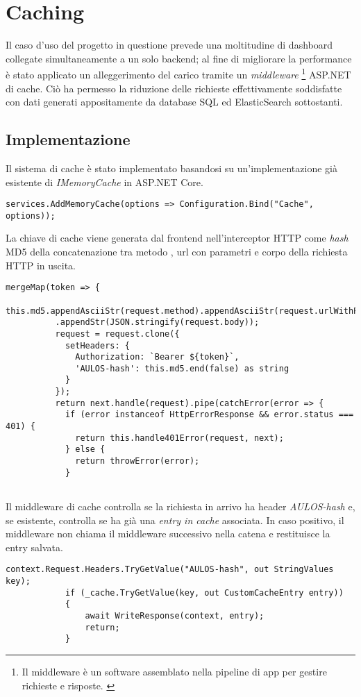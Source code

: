 \section{Caching}
\label{ch:caching}
Il caso d'uso del progetto in questione prevede una moltitudine di dashboard collegate simultaneamente a un solo backend; al fine di  migliorare la performance è stato applicato un alleggerimento del carico tramite un \textit{middleware} \footnote{Il middleware è un software assemblato nella pipeline di app per gestire richieste e risposte. \cite{Middleware}} ASP.NET di cache. Ciò ha permesso la riduzione delle richieste effettivamente soddisfatte con dati generati appositamente da database SQL ed ElasticSearch sottostanti.
\subsection{Implementazione}
Il sistema di cache è stato implementato basandosi su un'implementazione già esistente di \textit{IMemoryCache} in ASP.NET Core. \cite{MemCache}
\begin{lstlisting}[caption={Startup.cs, Memory Cache Injection}, style=javaScriptCode]
services.AddMemoryCache(options => Configuration.Bind("Cache", options));
\end{lstlisting}

La chiave di cache viene generata dal frontend nell'interceptor HTTP come \textit{hash} MD5 \cite{MD5} della concatenazione tra metodo \cite{HTTPMETHODS}, url con parametri \cite{HTTPPARAMS} e corpo \cite{HTTPBODY} della richiesta HTTP in uscita.
\begin{lstlisting}[caption={Http Interceptor, line 28}, style=javaScriptCode]
mergeMap(token => {
          this.md5.appendAsciiStr(request.method).appendAsciiStr(request.urlWithParams)
          .appendStr(JSON.stringify(request.body));
          request = request.clone({
            setHeaders: {
              Authorization: `Bearer ${token}`,
              'AULOS-hash': this.md5.end(false) as string
            }
          });
          return next.handle(request).pipe(catchError(error => {
            if (error instanceof HttpErrorResponse && error.status === 401) {
              return this.handle401Error(request, next);
            } else {
              return throwError(error);
            }
          
\end{lstlisting}

Il middleware di cache controlla se la richiesta in arrivo ha header \textit{AULOS-hash} e, se esistente, controlla se ha già una \textit{entry in cache} associata. In caso positivo, il middleware non chiama il middleware successivo nella catena e restituisce la entry salvata.
\begin{lstlisting}[caption={TotallyOriginalCachingMiddleware.cs, Cache hit scenario}, style=javaScriptCode]
context.Request.Headers.TryGetValue("AULOS-hash", out StringValues key);
            if (_cache.TryGetValue(key, out CustomCacheEntry entry))
            {
                await WriteResponse(context, entry);
                return;
            }
\end{lstlisting}

